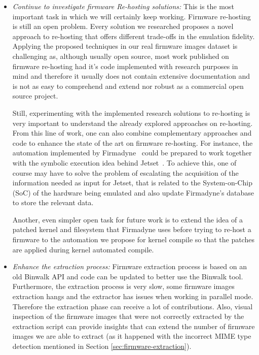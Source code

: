 \begin{itemize}
    \item \textit{Continue to investigate firmware Re-hosting solutions:} This is the most important task in which we will certainly keep working. Firmware re-hosting is still an open problem. Every solution we researched proposes a novel approach to re-hosting that offers different trade-offs in the emulation fidelity. Applying the proposed techniques in our real firmware images dataset is challenging as, although usually open source, most work published on firmware re-hosting had it's code implemented with research purposes in mind and therefore it usually does not contain extensive documentation and is not as easy to comprehend and extend nor robust as a commercial open source project.
    
    Still, experimenting with the implemented research solutions to re-hosting is very important to understand the already explored approaches on re-hosting. From this line of work, one can also combine complementary approaches and code to enhance the state of the art on firmware re-hosting. For instance, the automation implemented by Firmadyne~\cite{firmadyne} could be prepared to work together with the symbolic execution idea behind Jetset~\cite{jetset}. To achieve this, one of course may have to solve the problem of escalating the acquisition of the information needed as input for Jetset, that is related to the System-on-Chip (SoC) of the hardware being emulated and also update Firmadyne's database to store the relevant data.
    
    Another, even simpler open task for future work is to extend the idea of a patched kernel and filesystem that Firmadyne uses before trying to re-host a firmware to the automation we propose for kernel compile so that the patches are applied during kernel automated compile.
    
    \item \textit{Enhance the extraction process:} Firmware extraction process is based on an old Binwalk API and code can be updated to better use the Binwalk tool. Furthermore, the extraction process is very slow, some firmware images extraction hangs and the extractor has issues when working in parallel mode. Therefore the extraction phase can receive a lot of contributions. Also, visual inspection of the firmware images that were not correctly extracted by the extraction script can provide insights that can extend the number of firmware images we are able to extract (as it happened with the incorrect MIME type detection mentioned in Section \ref{sec:firmware-extraction}).
    

\end{itemize}
